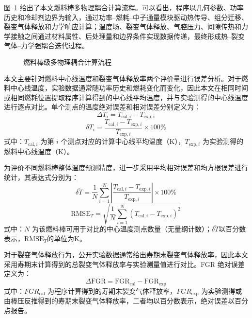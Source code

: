 图~\ref{fig:fuel_rod_multiphysics_flowchart} 给出了本文燃料棒多物理耦合计算流程。可以看出，程序以几何参数、功率历史和冷却剂边界为输入，通过功率--燃耗--中子通量模块驱动热传导、组分迁移、裂变气体释放和力学响应计算；温度场、裂变气体释放、气腔压力、间隙传热和力学接触之间通过材料属性、后处理量和边界条件实现数据传递，最终形成热--裂变气体--力学强耦合迭代过程。

\begin{figure}[!htb]
	\centering
	
	\caption{燃料棒级多物理耦合计算流程}
	\label{fig:fuel_rod_multiphysics_flowchart}
\end{figure}

\label{section:error_evalution_metrics}
本文主要针对燃料中心线温度和裂变气体释放率两个评价量进行误差分析。对于燃料中心线温度，实验数据通常随功率历史和燃耗变化而变化，因此本文在相同时间或相同燃耗位置提取程序计算得到的中心线平均温度，并与实验测得的中心线温度进行逐点对比。单个测点的温度绝对误差和相对误差分别定义为：
\begin{equation}
	\Delta T_i = T_{\mathrm{cal},i}-T_{\mathrm{exp},i}
\end{equation}
\begin{equation}
	\delta T_i = \frac{T_{\mathrm{cal},i}-T_{\mathrm{exp},i}}{T_{\mathrm{exp},i}}\times 100\%
\end{equation}
\noindent 式中：$T_{\mathrm{cal},i}$ 为第 $i$ 个测点对应的计算中心线平均温度（$\mathrm{K}$），$T_{\mathrm{exp},i}$ 为实验测得的燃料中心线温度（$\mathrm{K}$）。

为评价不同燃料棒整体温度预测精度，进一步采用平均相对误差和均方根误差进行统计，其表达式分别为：
\begin{equation}
	\overline{\delta T} =
	\frac{1}{N}\sum_{i=1}^{N}
	\left|
	\frac{T_{\mathrm{cal},i}-T_{\mathrm{exp},i}}{T_{\mathrm{exp},i}}
	\right|\times 100\%
\end{equation}
\begin{equation}
	\mathrm{RMSE}_T =
	\sqrt{
		\frac{1}{N}\sum_{i=1}^{N}
		\left(T_{\mathrm{cal},i}-T_{\mathrm{exp},i}\right)^2
	}
\end{equation}
\noindent 式中：$N$ 为该燃料棒可用于对比的中心温度测点数量（无量纲计数）；$\overline{\delta T}$以百分数表示，$\mathrm{RMSE}_T$的单位为$\mathrm{K}$。

对于裂变气体释放行为，公开实验数据通常给出寿期末裂变气体释放率，因此本文采用寿期末计算得到的总裂变气体释放率与实验测量值进行对比。FGR 绝对误差定义为：
\begin{equation}
	\Delta \mathrm{FGR} = \mathrm{FGR}_{\mathrm{cal}} - \mathrm{FGR}_{\mathrm{exp}}
\end{equation}
\noindent 式中：$FGR_{\mathrm{cal}}$ 为程序计算得到的寿期末裂变气体释放率，$FGR_{\mathrm{exp}}$ 为实验测得或由棒压反推得到的寿期末裂变气体释放率，二者均以百分数表示，绝对误差以百分点报告。

